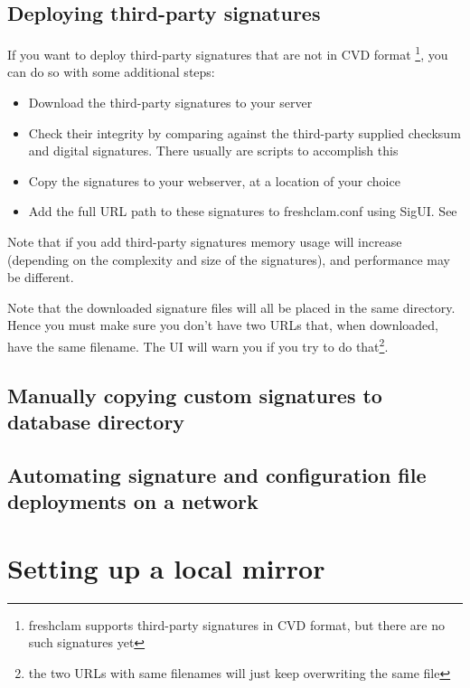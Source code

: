 \subsection{Deploying third-party signatures}

If you want to deploy third-party signatures that are not in \gls{CVD} format \footnote{freshclam supports third-party signatures in CVD format, but there are no such signatures yet}, you can do so with some additional steps:
\begin{itemize}
\item Download the third-party signatures to your server
\item Check their integrity by comparing against the third-party supplied checksum and digital signatures. There usually are scripts to accomplish this
\item Copy the signatures to your webserver, at a location of your choice
\item Add the full URL path to these signatures to \gls{freshclam.conf} using \gls{SigUI}.
See 
\end{itemize}

Note that if you add third-party signatures memory usage will increase (depending on the complexity and size of the signatures), and performance may be different.

Note that the downloaded signature files will all be placed in the same directory. Hence you must make sure you don't have two URLs that, when downloaded, have the same filename.
The UI will warn you if you try to do that\footnote{the two URLs with same filenames will just keep overwriting the same file}.

\subsection{Manually copying custom signatures to database directory}
\label{sec:custommanual}

\subsection{Automating signature and configuration file deployments on a network}
\label{sec:customautomatedcopy}
\label{sec:deploy_conf}

\section{Setting up a local mirror}
\label{sec:localmirror}


